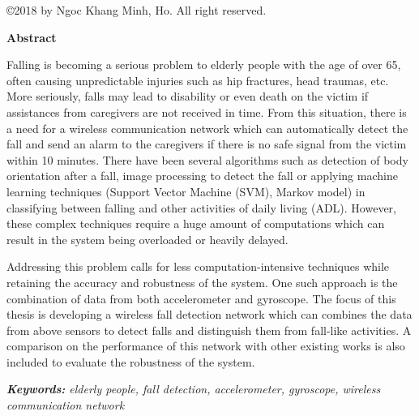 \begin{center}
\vspace*{\fill}
\copyright 2018 by Ngoc Khang Minh, Ho. All right reserved.
\vspace*{\fill}
\end{center}



\cleardoublepage

\begin{center}\textbf{Abstract}\end{center}
{
	\par
	Falling is becoming a serious problem to elderly people with the age of over 65, often causing unpredictable injuries such as hip fractures, head traumas, etc. More seriously, falls may lead to disability or even death on the victim if assistances from caregivers are not received in time. From this situation, there is a need for a wireless communication network which can automatically detect the fall and send an alarm to the caregivers if there is no safe signal from the victim within 10 minutes. There have been several algorithms such as detection of body orientation after a fall, image processing to detect the fall or applying machine learning techniques (Support Vector Machine (SVM), Markov model) in classifying between falling and other activities of daily living (ADL). However, these complex techniques require a huge amount of computations which can result in the system being overloaded or heavily delayed.\par
	Addressing this problem calls for less computation-intensive techniques while retaining the accuracy and robustness of the system. One such approach is the combination of data from both accelerometer and gyroscope. The focus of this thesis is developing a wireless fall detection network which can combines the data from above sensors to detect falls and distinguish them from fall-like activities. A comparison on the performance of this network with other existing works is also included to evaluate the robustness of the system.\par
	\vspace{1cm}
	\textit{\textbf{Keywords:} elderly people, fall detection, accelerometer, gyroscope,  wireless communication network}
}
\cleardoublepage


